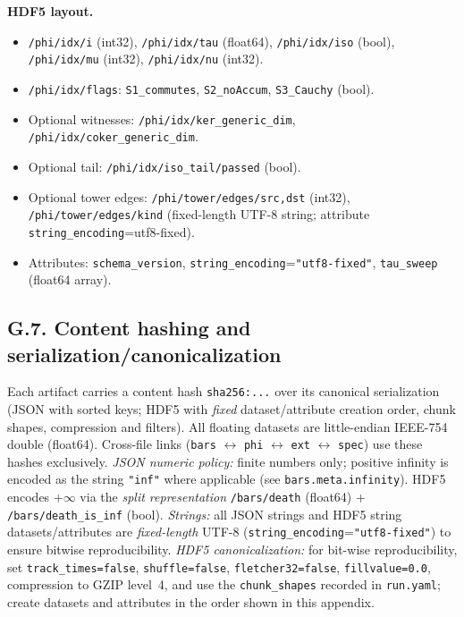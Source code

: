 \documentclass[11pt]{article}
\newcommand{\dq}{\textquotedbl}
\numberwithin{equation}{section}
\theoremstyle{definition}
\begin{document}
\noindent\textbf{HDF5 layout.}
\begin{itemize}
\item \texttt{/phi/idx/i} (int32), \texttt{/phi/idx/tau} (float64),
\texttt{/phi/idx/iso} (bool), \texttt{/phi/idx/mu} (int32), \texttt{/phi/idx/nu} (int32).
\item \texttt{/phi/idx/flags}: \texttt{S1\_commutes}, \texttt{S2\_noAccum}, \texttt{S3\_Cauchy} (bool).
\item Optional witnesses: \texttt{/phi/idx/ker\_generic\_dim}, \texttt{/phi/idx/coker\_generic\_dim}.
\item Optional tail: \texttt{/phi/idx/iso\_tail/passed} (bool).
\item Optional tower edges: \texttt{/phi/tower/edges/src,dst} (int32),
\texttt{/phi/tower/edges/kind} (fixed-length UTF-8 string; attribute \texttt{string\_encoding}=\dq utf8-fixed\dq).
\item Attributes: \texttt{schema\_version}, \texttt{string\_encoding}=\texttt{"utf8-fixed"},
\texttt{tau\_sweep} (float64 array).
\end{itemize}

\subsection*{G.7. Content hashing and serialization/canonicalization}
Each artifact carries a content hash \texttt{sha256:...} over its canonical serialization
(JSON with sorted keys; HDF5 with \emph{fixed} dataset/attribute creation order, chunk shapes,
compression and filters). All floating datasets are little-endian IEEE-754 double (float64).
Cross-file links (\texttt{bars} \(\leftrightarrow\) \texttt{phi} \(\leftrightarrow\) \texttt{ext} \(\leftrightarrow\) \texttt{spec})
use these hashes exclusively.
\emph{JSON numeric policy:} finite numbers only; positive infinity is encoded as the string
\texttt{"inf"} where applicable (see \texttt{bars.meta.infinity}). HDF5 encodes \(+\infty\) via the
\emph{split representation} \texttt{/bars/death} (float64) + \texttt{/bars/death\_is\_inf} (bool).
\emph{Strings:} all JSON strings and HDF5 string datasets/attributes are \emph{fixed-length} UTF-8
(\texttt{string\_encoding}=\texttt{"utf8-fixed"}) to ensure bitwise reproducibility.
\emph{HDF5 canonicalization:} for bit-wise reproducibility, set \texttt{track\_times=false},
\texttt{shuffle=false}, \texttt{fletcher32=false}, \texttt{fillvalue=0.0}, compression to GZIP level~4,
and use the \texttt{chunk\_shapes} recorded in \texttt{run.yaml}; create datasets and attributes in the
order shown in this appendix.
\end{document}
